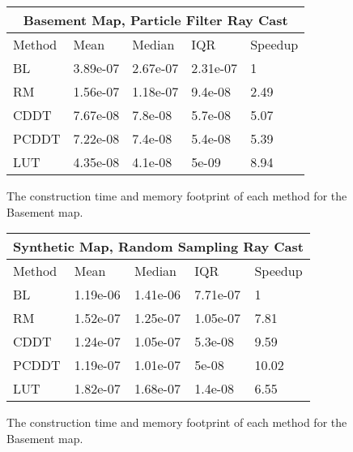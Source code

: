 \documentclass[letterpaper, 10 pt, conference]{ieeeconf}  %
\begin{document}
\begin{figure}[h]
\begin{center}
\begin{tabular}{ | m{1.05cm} | m{1.3cm}| m{1.6cm} | m{1.25cm} | m{1.25cm}|  } 
\hline
\multicolumn{5}{|c|}{Basement Map, Particle Filter Ray Cast} \\
\hline
Method & Mean & Median & IQR & Speedup \\
\hline
BL & 3.89e-07 & 2.67e-07 & 2.31e-07 & 1 \\
RM & 1.56e-07 & 1.18e-07 & 9.4e-08 & 2.49 \\
CDDT & 7.67e-08 & 7.8e-08 & 5.7e-08 & 5.07 \\
PCDDT & 7.22e-08 & 7.4e-08 & 5.4e-08 & 5.39 \\
LUT & 4.35e-08 & 4.1e-08 & 5e-09 & 8.94 \\
\hline
\end{tabular}
\end{center}
\caption{The construction time and memory footprint of each method for the Basement map.}
\label{table:basement:init}
\end{figure}

\begin{figure}[h]
\begin{center}
\begin{tabular}{ | m{1.05cm} | m{1.3cm}| m{1.6cm} | m{1.25cm} | m{1.25cm}|  } 
\hline
\multicolumn{5}{|c|}{Synthetic Map, Random Sampling Ray Cast} \\
\hline
Method & Mean & Median & IQR & Speedup \\
\hline
BL & 1.19e-06 & 1.41e-06 & 7.71e-07 & 1 \\
RM & 1.52e-07 & 1.25e-07 & 1.05e-07 & 7.81 \\
CDDT & 1.24e-07 & 1.05e-07 & 5.3e-08 & 9.59 \\
PCDDT & 1.19e-07 & 1.01e-07 & 5e-08 & 10.02 \\ 
LUT & 1.82e-07 & 1.68e-07 & 1.4e-08 & 6.55 \\
\hline
\end{tabular}
\end{center}
\caption{The construction time and memory footprint of each method for the Basement map.}
\label{table:basement:init}
\end{figure}
\end{document}
